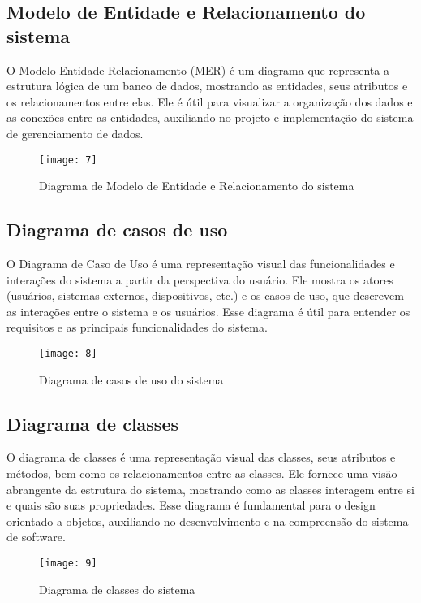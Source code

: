 \subsection{Modelo de Entidade e Relacionamento do sistema}

O Modelo Entidade-Relacionamento (MER) \cite{26} é um diagrama que representa a estrutura lógica de um banco de dados, mostrando as entidades, seus atributos e os relacionamentos entre elas. Ele é útil para visualizar a organização dos dados e as conexões entre as entidades, auxiliando no projeto e implementação do sistema de gerenciamento de dados.

\begin{figure}[h]
  \caption{Diagrama de Modelo de Entidade e Relacionamento do sistema}
  \centering
  \texttt{[image: 7]}
\end{figure}
\FloatBarrier

\clearpage
\subsection{Diagrama de casos de uso}

O Diagrama de Caso de Uso \cite{27} é uma representação visual das funcionalidades e interações do sistema a partir da perspectiva do usuário. Ele mostra os atores (usuários, sistemas externos, dispositivos, etc.) e os casos de uso, que descrevem as interações entre o sistema e os usuários. Esse diagrama é útil para entender os requisitos e as principais funcionalidades do sistema.

\begin{figure}[h]
  \caption{Diagrama de casos de uso do sistema}
  \centering
  \texttt{[image: 8]}
\end{figure}
\FloatBarrier

\clearpage
\subsection{Diagrama de classes}

O diagrama de classes \cite{27} é uma representação visual das classes, seus atributos e métodos, bem como os relacionamentos entre as classes. Ele fornece uma visão abrangente da estrutura do sistema, mostrando como as classes interagem entre si e quais são suas propriedades. Esse diagrama é fundamental para o design orientado a objetos, auxiliando no desenvolvimento e na compreensão do sistema de software.

\begin{figure}[h]
  \caption{Diagrama de classes do sistema}
  \centering
  \texttt{[image: 9]}
\end{figure}
\FloatBarrier

